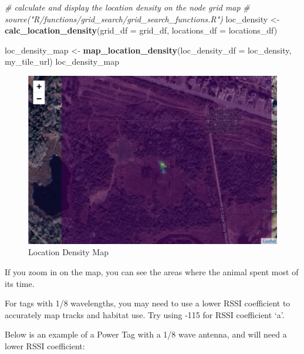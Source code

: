 \documentclass[
]{book}
\newenvironment{Shaded}{\begin{snugshade}}{\end{snugshade}}
\newcommand{\AttributeTok}[1]{\textcolor[rgb]{0.13,0.29,0.53}{#1}}
\newcommand{\CommentTok}[1]{\textcolor[rgb]{0.56,0.35,0.01}{\textit{#1}}}
\newcommand{\FunctionTok}[1]{\textcolor[rgb]{0.13,0.29,0.53}{\textbf{#1}}}
\newcommand{\NormalTok}[1]{#1}
\newcommand{\OtherTok}[1]{\textcolor[rgb]{0.56,0.35,0.01}{#1}}
\begin{document}
\begin{Shaded}
\begin{Highlighting}[]
\CommentTok{\# calculate and display the location density on the node grid map}
\CommentTok{\# source("R/functions/grid\_search/grid\_search\_functions.R")}
\NormalTok{loc\_density }\OtherTok{\textless{}{-}} \FunctionTok{calc\_location\_density}\NormalTok{(}\AttributeTok{grid\_df =}\NormalTok{ grid\_df, }
                                     \AttributeTok{locations\_df =}\NormalTok{ locations\_df)}

\NormalTok{loc\_density\_map }\OtherTok{\textless{}{-}} \FunctionTok{map\_location\_density}\NormalTok{(}\AttributeTok{loc\_density\_df =}\NormalTok{ loc\_density, my\_tile\_url)}
\NormalTok{loc\_density\_map}
\end{Highlighting}
\end{Shaded}

\begin{figure}
\centering
\includegraphics{images/habitat_use_location_density_map.png}
\caption{Location Density Map}
\end{figure}

If you zoom in on the map, you can see the areas where the animal spent most of its time.

For tags with 1/8 wavelengths, you may need to use a lower RSSI coefficient to accurately map tracks and habitat use. Try using -115 for RSSI coefficient `a'.

Below is an example of a Power Tag with a 1/8 wave antenna, and will need a lower RSSI coefficient:
\end{document}
